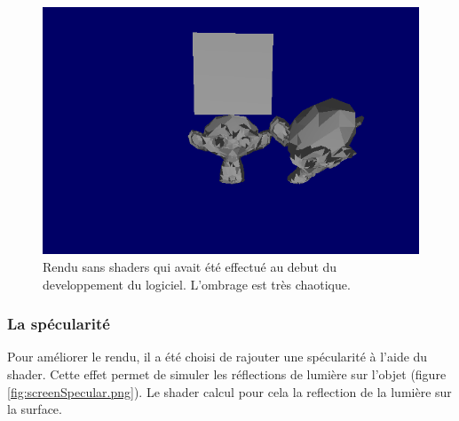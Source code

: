 \begin{figure}[h!]
	\centering
	\includegraphics[scale=0.5]{images/rendu_sans_shader.png}
	\caption{\label{fig:screenRenduSansShader.png} Rendu sans shaders qui avait été effectué au debut du developpement du logiciel. L'ombrage est très chaotique. \protect}
\end{figure}

\subsubsection{La spécularité}
Pour améliorer le rendu, il a été choisi de rajouter une spécularité à l'aide du shader. Cette effet permet de simuler les réflections de lumière sur l'objet (figure \ref{fig:screenSpecular.png}). Le shader calcul pour cela la reflection de la lumière sur la surface.


